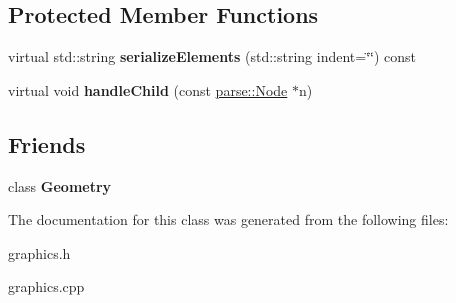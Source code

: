 \subsection*{Protected Member Functions}
\begin{DoxyCompactItemize}
\item 
\hypertarget{classg2c_1_1_index_buffer_a71b7b8742269322b6beb4cc49c6187b3}{
virtual std::string {\bfseries serializeElements} (std::string indent=\char`\"{}\char`\"{}) const }
\label{classg2c_1_1_index_buffer_a71b7b8742269322b6beb4cc49c6187b3}

\item 
\hypertarget{classg2c_1_1_index_buffer_ab8108ac228531a7d14e20f1163a5756d}{
virtual void {\bfseries handleChild} (const \hyperlink{classparse_1_1_node}{parse::Node} $\ast$n)}
\label{classg2c_1_1_index_buffer_ab8108ac228531a7d14e20f1163a5756d}

\end{DoxyCompactItemize}
\subsection*{Friends}
\begin{DoxyCompactItemize}
\item 
\hypertarget{classg2c_1_1_index_buffer_a9aca7b7350e6ffa0e2d6320834ad1857}{
class {\bfseries Geometry}}
\label{classg2c_1_1_index_buffer_a9aca7b7350e6ffa0e2d6320834ad1857}

\end{DoxyCompactItemize}


The documentation for this class was generated from the following files:\begin{DoxyCompactItemize}
\item 
graphics.h\item 
graphics.cpp\end{DoxyCompactItemize}
